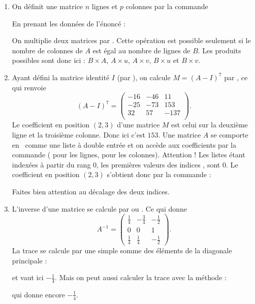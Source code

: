 \documentclass[class=report,crop=false]{standalone}
\begin{document}
\begin{enumerate}
  \item On définit une matrice $n$ lignes et $p$ colonnes par la commande \\
  \centerline{}
  
  En prenant les données de l'énoncé :
  
  On multiplie deux matrices par .
  Cette opération est possible seulement si le nombre de colonnes de $A$ est égal au nombre de lignes de $B$.
  Les produits possibles sont donc ici : 
  $B\times A$, $A \times u$, $A \times v$,  $B \times u$ et $B \times v$.
  
  
  \item Ayant défini la matrice identité $I$ (par ), 
  on calcule $M = (A-I)^{7}$ par , ce qui renvoie
  $$(A-I)^{7} = \begin{pmatrix}-16& -46&  11\\-25& -73& 153\\32&  57& -137\\\end{pmatrix}.$$
  Le coefficient en position $(2,3)$ d'une matrice $M$ 
  est celui sur la deuxième ligne et la troisième colonne.
  Donc ici c'est $153$.
  Une matrice $A$ se comporte en \Sage\ comme une liste à double entrée et 
  on accède aux coefficients par la commande  (
  pour les lignes,  pour les colonnes).
  Attention ! Les listes étant indexées à partir du rang $0$, les premières valeurs des 
  indices ,  sont $0$.
  Le coefficient en position $(2,3)$ s'obtient donc par la commande :\\
  \centerline{}
  Faites bien attention au décalage des deux indices.
  
  
  \item L'inverse d'une matrice  se calcule par
   ou . 
  Ce qui donne 
  $$A^{-1} = \begin{pmatrix}\frac14&-\frac34&-\frac12\\0& 0& 1\\\frac14& \frac14&-\frac12\end{pmatrix}.$$
  La trace se calcule par une simple somme des éléments de la diagonale principale : \\
  \centerline{}
  et vaut ici $-\frac14$.
  Mais on peut aussi calculer la trace avec la méthode  :\\
  \centerline{}
  qui donne encore $-\frac{1}{4}$.

\end{enumerate}
\end{document}
